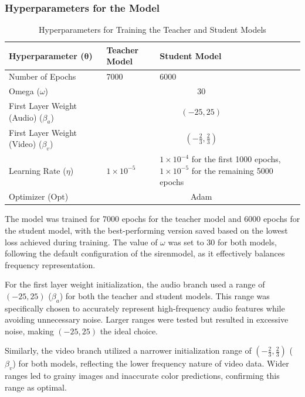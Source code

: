 \subsubsection{Hyperparameters for the Model}
\begin{table}[H]
    \centering
    \caption{Hyperparameters for Training the Teacher and Student Models}
    \begin{tabular}{|l|p{}|p{}|}
    \hline
    \textbf{Hyperparameter ($\boldsymbol{\theta}$)} & \textbf{Teacher Model} & \textbf{Student Model}  \\
    \hline
    Number of Epochs                   & 7000                    & 6000                    \\
    \hline
    \multicolumn{1}{|l|}{Omega ($\omega$)} & \multicolumn{2}{c|}{30}  \\
    \hline
    \multicolumn{1}{|l|}{First Layer Weight (Audio) ($\beta_a$)} & \multicolumn{2}{c|}{$(-25, 25)$} \\
    \hline
    \multicolumn{1}{|l|}{First Layer Weight (Video) ($\beta_v$)} & \multicolumn{2}{c|}{$\left(-\frac{2}{3}, \frac{2}{3}\right)$} \\
    \hline
    Learning Rate ($\eta$)              & $1\times10^{-5}$       & $1\times10^{-4}$ for the first 1000 epochs, $1\times10^{-5}$ for the remaining 5000 epochs \\
    \hline
    \multicolumn{1}{|l|}{Optimizer ($\text{Opt}$)} & \multicolumn{2}{c|}{Adam} \\
    \hline
    \end{tabular}
    \label{tab:teacher_student_model_hyperparams}
\end{table}
    
The model was trained for 7000 epochs for the teacher model and 6000 epochs for the student model, with the best-performing version saved based on the lowest loss achieved during training. The value of $\omega$ was set to 30 for both models, following the default configuration of the \gls{siren}model, as it effectively balances frequency representation.

For the first layer weight initialization, the audio branch used a range of $(-25, 25)$ ($\beta_a$) for both the teacher and student models. This range was specifically chosen to accurately represent high-frequency audio features while avoiding unnecessary noise. Larger ranges were tested but resulted in excessive noise, making $(-25, 25)$ the ideal choice.

Similarly, the video branch utilized a narrower initialization range of $\left(-\frac{2}{3}, \frac{2}{3}\right)$ ($\beta_v$) for both models, reflecting the lower frequency nature of video data. Wider ranges led to grainy images and inaccurate color predictions, confirming this range as optimal.

